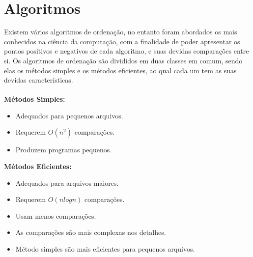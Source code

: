 \documentclass[
	12pt,				%
	oneside,			%
	a4paper,			%
	english,			%
	brazil,				%
	]{article}
\begin{document}
\section{Algoritmos}
Existem vários algoritmos de ordenação, no entanto foram abordados os mais conhecidos na ciência da computação, com a finalidade
de poder apresentar os pontos positivos e negativos de cada algoritmo, e suas devidas comparações entre si. Os algoritmos de ordenação são 
divididos em duas classes em comum, sendo elas os métodos simples e os métodos eficientes, ao qual cada um tem as suas devidas características.\\ \\ \cite{Algoritmoss}
\textbf{Métodos Simples:}
\begin{itemize}
 \item Adequados para pequenos arquivos.
 \item Requerem \begin{math} O(n^2)\end{math} comparações.
 \item Produzem programas pequenos.
\end{itemize}
\textbf{Métodos Eficientes:}
\begin{itemize}
 \item Adequados para arquivos maiores.
 \item Requerem \begin{math} O(n logn)\end{math} comparações.
 \item Usam menos comparações.
 \item As comparações são mais complexas nos detalhes.
 \item Método simples são mais eficientes para pequenos arquivos.
\end{itemize}
\end{document}
